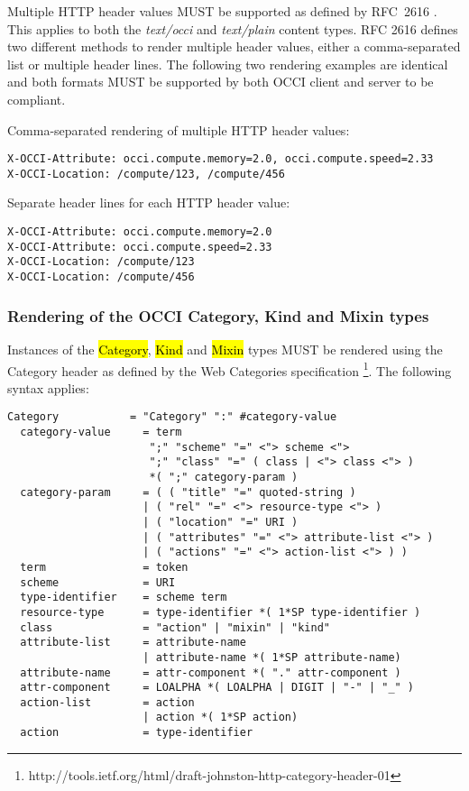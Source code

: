 \documentclass[10pt,a4paper]{article}
\begin{document}
Multiple HTTP header values MUST be supported as defined by RFC~2616
\cite{rfc2616}. This applies to both the \textit{text/occi} and
\textit{text/plain} content types. RFC 2616 defines two different methods
to render multiple header values, either a comma-separated list or multiple
header lines. The following two rendering examples are identical and both formats
MUST be supported by both OCCI client and server to be compliant.

Comma-separated rendering of multiple HTTP header values:
\begin{verbatim}
X-OCCI-Attribute: occi.compute.memory=2.0, occi.compute.speed=2.33
X-OCCI-Location: /compute/123, /compute/456
\end{verbatim}
%
Separate header lines for each HTTP header value:
\begin{verbatim}
X-OCCI-Attribute: occi.compute.memory=2.0
X-OCCI-Attribute: occi.compute.speed=2.33
X-OCCI-Location: /compute/123
X-OCCI-Location: /compute/456
\end{verbatim}

\subsubsection{Rendering of the OCCI Category, Kind and Mixin types}
Instances of the \hl{Category}, \hl{Kind} and \hl{Mixin} types \cite{occi:core}
MUST be rendered using the Category header as defined by the Web Categories
specification%
\footnote{http://tools.ietf.org/html/draft-johnston-http-category-header-01}.
%
The following syntax applies:

\begin{verbatim}
Category           = "Category" ":" #category-value
  category-value     = term
                      ";" "scheme" "=" <"> scheme <">
                      ";" "class" "=" ( class | <"> class <"> )
                      *( ";" category-param )
  category-param     = ( ( "title" "=" quoted-string )
                     | ( "rel" "=" <"> resource-type <"> )
                     | ( "location" "=" URI )
                     | ( "attributes" "=" <"> attribute-list <"> )
                     | ( "actions" "=" <"> action-list <"> ) )
  term               = token
  scheme             = URI
  type-identifier    = scheme term
  resource-type      = type-identifier *( 1*SP type-identifier )
  class              = "action" | "mixin" | "kind"
  attribute-list     = attribute-name
                     | attribute-name *( 1*SP attribute-name)
  attribute-name     = attr-component *( "." attr-component )
  attr-component     = LOALPHA *( LOALPHA | DIGIT | "-" | "_" )
  action-list        = action 
                     | action *( 1*SP action)
  action             = type-identifier
\end{verbatim}
\end{document}
